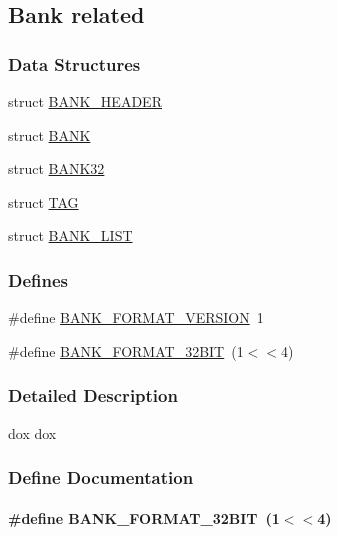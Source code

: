 \subsection{Bank related}
\label{group__mbank}
\subsubsection*{Data Structures}
\begin{DoxyCompactItemize}
\item 
struct \hyperlink{structBANK__HEADER}{BANK\_\-HEADER}
\item 
struct \hyperlink{structBANK}{BANK}
\item 
struct \hyperlink{structBANK32}{BANK32}
\item 
struct \hyperlink{structTAG}{TAG}
\item 
struct \hyperlink{structBANK__LIST}{BANK\_\-LIST}
\end{DoxyCompactItemize}
\subsubsection*{Defines}
\begin{DoxyCompactItemize}
\item 
\#define \hyperlink{group__mbank_gaee768d2c28265eb2b34227d7eae57a18}{BANK\_\-FORMAT\_\-VERSION}~1
\item 
\#define \hyperlink{group__mbank_gadc7ea449441f9c3bbe110cf41333bc7b}{BANK\_\-FORMAT\_\-32BIT}~(1$<$$<$4)
\end{DoxyCompactItemize}


\subsubsection{Detailed Description}
dox dox 

\subsubsection{Define Documentation}
\paragraph[{BANK\_\-FORMAT\_\-32BIT}]{\setlength{\rightskip}{0pt plus 5cm}\#define BANK\_\-FORMAT\_\-32BIT~(1$<$$<$4)}\hfill\label{group__mbank_gadc7ea449441f9c3bbe110cf41333bc7b}

